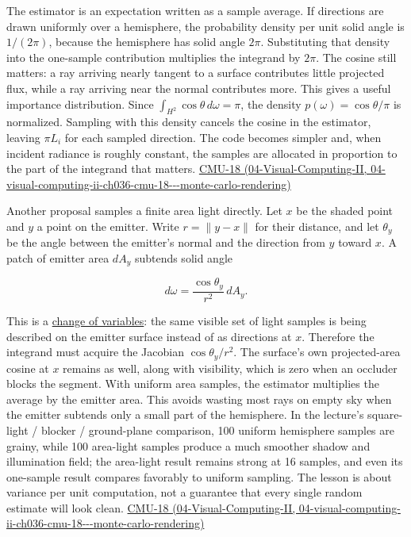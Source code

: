 The estimator is an expectation written as a sample average. If directions are drawn uniformly over a hemisphere, the probability density per unit solid angle is \(1/(2\pi)\), because the hemisphere has solid angle \(2\pi\). Substituting that density into the one-sample contribution multiplies the integrand by \(2\pi\). The cosine still matters: a ray arriving nearly tangent to a surface contributes little projected flux, while a ray arriving near the normal contributes more. This gives a useful importance distribution. Since \(\int_{H^2}\cos\theta\,d\omega=\pi\), the density \(p(\omega)=\cos\theta/\pi\) is normalized. Sampling with this density cancels the cosine in the estimator, leaving \(\pi L_i\) for each sampled direction. The code becomes simpler and, when incident radiance is roughly constant, the samples are allocated in proportion to the part of the integrand that matters. \href{../04-Visual-Computing-II/main.pdf\#nameddest=04-visual-computing-ii-ch036-cmu-18---monte-carlo-rendering}{CMU-18 (04-Visual-Computing-II, 04-visual-computing-ii-ch036-cmu-18-\/-\/-monte-carlo-rendering)}

Another proposal samples a finite area light directly. Let \(x\) be the shaded point and \(y\) a point on the emitter. Write \(r=\|y-x\|\) for their distance, and let \(\theta_y\) be the angle between the emitter's normal and the direction from \(y\) toward \(x\). A patch of emitter area \(dA_y\) subtends solid angle

\[
d\omega = \frac{\cos\theta_y}{r^2}\,dA_y.
\]

This is a \hyperref[appendix-4815cd87ab8b]{change of variables}: the same visible set of light samples is being described on the emitter surface instead of as directions at \(x\). Therefore the integrand must acquire the Jacobian \(\cos\theta_y/r^2\). The surface's own projected-area cosine at \(x\) remains as well, along with visibility, which is zero when an occluder blocks the segment. With uniform area samples, the estimator multiplies the average by the emitter area. This avoids wasting most rays on empty sky when the emitter subtends only a small part of the hemisphere. In the lecture's square-light / blocker / ground-plane comparison, 100 uniform hemisphere samples are grainy, while 100 area-light samples produce a much smoother shadow and illumination field; the area-light result remains strong at 16 samples, and even its one-sample result compares favorably to uniform sampling. The lesson is about variance per unit computation, not a guarantee that every single random estimate will look clean. \href{../04-Visual-Computing-II/main.pdf\#nameddest=04-visual-computing-ii-ch036-cmu-18---monte-carlo-rendering}{CMU-18 (04-Visual-Computing-II, 04-visual-computing-ii-ch036-cmu-18-\/-\/-monte-carlo-rendering)}

